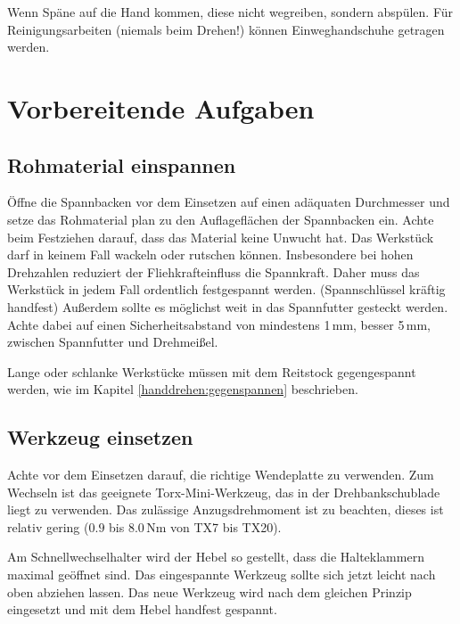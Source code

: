 \documentclass{\basedir/fablab-document}
\begin{document}
Wenn Späne auf die Hand kommen, diese nicht wegreiben, sondern abspülen. Für Reinigungsarbeiten (niemals beim Drehen!) können Einweghandschuhe getragen werden.




\section{Vorbereitende Aufgaben}
\subsection{Rohmaterial einspannen}

Öffne die Spannbacken vor dem Einsetzen auf einen adäquaten Durchmesser und setze das Rohmaterial
plan zu den Auflageflächen der Spannbacken ein.
Achte beim Festziehen darauf, dass das Material keine Unwucht hat.
Das Werkstück darf in keinem Fall wackeln oder rutschen können. 
Insbesondere bei hohen Drehzahlen reduziert der Fliehkrafteinfluss die Spannkraft.
Daher muss das Werkstück in jedem Fall ordentlich festgespannt werden. (Spannschlüssel kräftig handfest)
Außerdem sollte es möglichst weit in das Spannfutter gesteckt werden.
Achte dabei auf einen Sicherheitsabstand von mindestens 1\,mm, besser 5\,mm, zwischen Spannfutter und Drehmeißel.

Lange oder schlanke Werkstücke müssen mit dem Reitstock gegengespannt werden,
wie im Kapitel \ref{handdrehen:gegenspannen} beschrieben.

\subsection{Werkzeug einsetzen} %
Achte vor dem Einsetzen darauf, die richtige Wendeplatte zu verwenden. Zum Wechseln ist das geeignete Torx-Mini-Werkzeug, das in der Drehbankschublade liegt zu verwenden. Das zulässige Anzugsdrehmoment ist zu beachten, dieses ist relativ gering ($0.9$ bis $8.0$\,Nm von TX7 bis TX20).

Am Schnellwechselhalter wird der Hebel so gestellt, dass die Halteklammern maximal geöffnet sind.
Das eingespannte Werkzeug sollte sich jetzt leicht nach oben abziehen lassen.
Das neue Werkzeug wird nach dem gleichen Prinzip eingesetzt und mit dem Hebel handfest gespannt.
\end{document}
